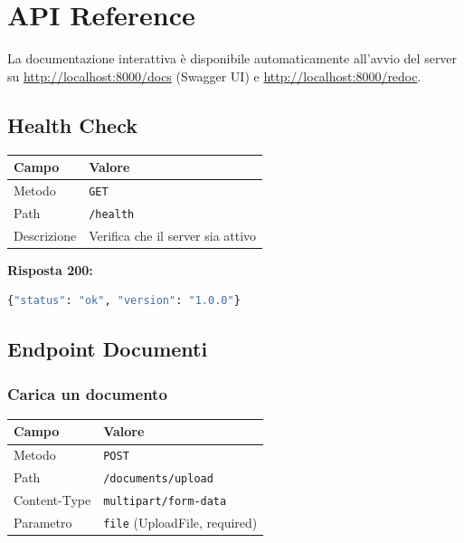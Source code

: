 \chapter{API Reference}

La documentazione interattiva è disponibile automaticamente all'avvio del server
su \url{http://localhost:8000/docs} (Swagger UI) e \url{http://localhost:8000/redoc}.

\section{Health Check}

\begin{table}[H]
  \centering
  \begin{tabularx}{\textwidth}{lX}
    \toprule
    \textbf{Campo} & \textbf{Valore} \\
    \midrule
    Metodo & \texttt{GET} \\
    Path   & \texttt{/health} \\
    Descrizione & Verifica che il server sia attivo \\
    \bottomrule
  \end{tabularx}
\end{table}

\textbf{Risposta 200:}
\begin{lstlisting}[language=Python]
{"status": "ok", "version": "1.0.0"}
\end{lstlisting}

\section{Endpoint Documenti}

\subsection{Carica un documento}

\begin{table}[H]
  \centering
  \begin{tabularx}{\textwidth}{lX}
    \toprule
    \textbf{Campo} & \textbf{Valore} \\
    \midrule
    Metodo      & \texttt{POST} \\
    Path        & \texttt{/documents/upload} \\
    Content-Type & \texttt{multipart/form-data} \\
    Parametro   & \texttt{file} (UploadFile, required) \\
    \bottomrule
  \end{tabularx}
\end{table}

